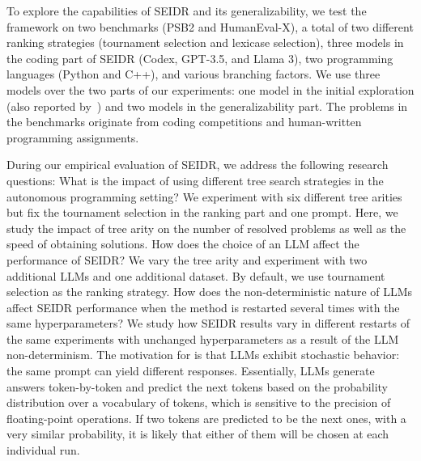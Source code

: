To explore the capabilities of SEIDR and its generalizability, we test the framework on two benchmarks (PSB2 and
HumanEval-X), a total of two different ranking strategies (tournament selection and lexicase selection),
three models in the coding part of SEIDR (Codex, GPT-3.5, and Llama 3), two programming languages (Python and C++), and various branching factors.
We use three models over the two parts of our experiments: one model in the initial exploration (also reported by~\cite{liventsevFullyAutonomousProgramming2023}) and two models in the generalizability part.
The problems in the benchmarks originate from coding competitions and human-written programming assignments. 

During our empirical evaluation of SEIDR, we address the following research questions:
What is the impact of using different tree search strategies
in the autonomous programming setting? 
We experiment with six different tree arities but fix the tournament selection in the ranking part and one prompt. 
Here, we study the impact of tree arity on the number of resolved problems as well as the speed of obtaining solutions.   
How does the choice of an LLM affect the performance of SEIDR? 
We vary the tree arity and experiment with two additional LLMs and one additional dataset.
By default, we use tournament selection as the ranking strategy. 
How does the non-deterministic nature of LLMs affect SEIDR performance when the method is restarted several times with the same hyperparameters?
We study how SEIDR results vary in different restarts of the same experiments with unchanged hyperparameters as a result of the LLM non-determinism. 
The motivation for \rqmultirun{} is that LLMs exhibit stochastic behavior: the same prompt can yield different responses. 
Essentially, LLMs generate answers token-by-token and predict the next tokens based on the probability distribution over a vocabulary of tokens, which is sensitive to the precision of floating-point operations. 
If two tokens are predicted to be the next ones, with a very similar probability, it is likely that either of them will be chosen at each individual run. 
